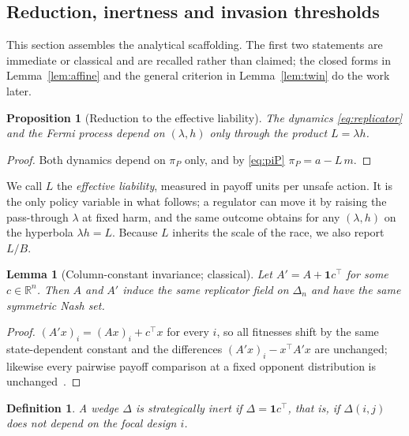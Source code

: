\documentclass[pdflatex]{sn-jnl}
\theoremstyle{thmstyleone}
\newtheorem{proposition}[theorem]{Proposition}
\newtheorem{lemma}[theorem]{Lemma}
\theoremstyle{thmstylethree}
\newtheorem{definition}[theorem]{Definition}
\theoremstyle{thmstyletwo}
\newcommand{\piP}{\pi_{P}}
\newcommand{\R}{\mathbb{R}}
\newcommand{\Simplex}{\Delta_{n}}
\begin{document}
\subsection{Reduction, inertness and invasion thresholds}

This section assembles the analytical scaffolding. The first two statements
are immediate or classical and are recalled rather than claimed; the closed
forms in Lemma~\ref{lem:affine} and the general criterion in
Lemma~\ref{lem:twin} do the work later.

\begin{proposition}[Reduction to the effective liability]\label{prop:reduction}
The dynamics \eqref{eq:replicator} and the Fermi process depend on
$(\lambda,h)$ only through the product $L=\lambda h$.
\end{proposition}

\begin{proof}
Both dynamics depend on $\piP$ only, and by \eqref{eq:piP} $\piP=a-L\,m$.
\end{proof}

We call $L$ the \emph{effective liability}, measured in payoff units per
unsafe action. It is the only policy variable in what follows; a regulator can
move it by raising the pass-through $\lambda$ at fixed harm, and the same
outcome obtains for any $(\lambda,h)$ on the hyperbola $\lambda h=L$. Because
$L$ inherits the scale of the race, we also report $L/B$.

\begin{lemma}[Column-constant invariance; classical]\label{lem:column}
Let $A'=A+\mathbf{1}c^{\top}$ for some $c\in\R^{n}$. Then $A$ and $A'$ induce
the same replicator field on $\Simplex$ and have the same symmetric Nash set.
\end{lemma}

\begin{proof}
$(A'x)_i=(Ax)_i+c^{\top}x$ for every $i$, so all fitnesses shift by the same
state-dependent constant and the differences $(A'x)_i-x^{\top}A'x$ are
unchanged; likewise every pairwise payoff comparison at a fixed opponent
distribution is unchanged~\citep{hofbauer1998evolutionary}.
\end{proof}

\begin{definition}
A wedge $\Delta$ is \emph{strategically inert} if $\Delta=\mathbf{1}c^{\top}$,
that is, if $\Delta(i,j)$ does not depend on the focal design $i$.
\end{definition}
\end{document}
